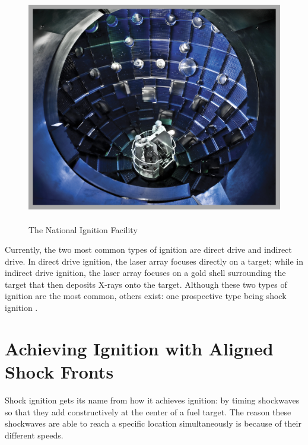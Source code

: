 \begin{figure}	
	\centering
	\includegraphics[scale=.4]{graphics/nif.jpg} 
	\caption[The National Ignition Facility]{ \\ The National Ignition Facility \\  }
	\label{fig:nif}
\end{figure}

Currently, the two most common types of ignition are direct drive and indirect drive.  In direct drive ignition, the laser array focuses directly on a target; while in indirect drive ignition, the laser array focuses on a gold shell surrounding the target that then deposits X-rays onto the target.  Although these two types of ignition are the most common, others exist: one prospective type being shock ignition \citep{summaryPaper}. 

\section{Achieving Ignition with Aligned Shock Fronts}

Shock ignition gets its name from how it achieves ignition: by timing shockwaves so that they add constructively at the center of a fuel target. The reason these shockwaves are able to reach a specific location simultaneously is because of their different speeds.  

